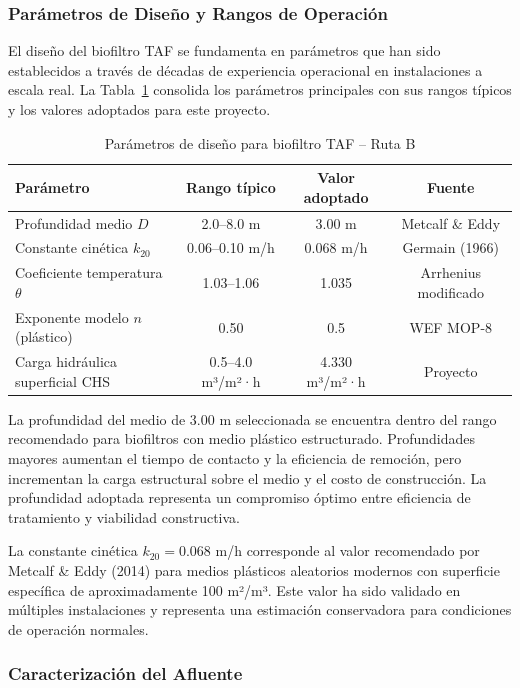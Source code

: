 \documentclass[12pt,a4paper]{article}
\begin{document}
\subsubsection*{Parámetros de Diseño y Rangos de Operación}

El diseño del biofiltro TAF se fundamenta en parámetros que han sido establecidos a través de décadas de experiencia operacional en instalaciones a escala real. La Tabla~\ref{tab:parametros_taf} consolida los parámetros principales con sus rangos típicos y los valores adoptados para este proyecto.

\begin{table}[H]
\centering
\caption{Parámetros de diseño para biofiltro TAF -- Ruta B}
\label{tab:parametros_taf}
\begin{tabular}{p{4cm}ccc}
\toprule
\textbf{Parámetro} & \textbf{Rango típico} & \textbf{Valor adoptado} & \textbf{Fuente} \\
\midrule
Profundidad medio $D$ & 2.0--8.0 m & 3.00 m & Metcalf \& Eddy \\
Constante cinética $k_{20}$ & 0.06--0.10 m/h & 0.068 m/h & Germain (1966) \\
Coeficiente temperatura $\theta$ & 1.03--1.06 & 1.035 & Arrhenius modificado \\
Exponente modelo $n$ (plástico) & 0.50 & 0.5 & WEF MOP-8 \\
Carga hidráulica superficial CHS & 0.5--4.0 m³/m²·h & 4.330 m³/m²·h & Proyecto \\
\bottomrule
\end{tabular}
\end{table}

La profundidad del medio de 3.00 m seleccionada se encuentra dentro del rango recomendado para biofiltros con medio plástico estructurado. Profundidades mayores aumentan el tiempo de contacto y la eficiencia de remoción, pero incrementan la carga estructural sobre el medio y el costo de construcción. La profundidad adoptada representa un compromiso óptimo entre eficiencia de tratamiento y viabilidad constructiva.

La constante cinética $k_{20} = 0.068$ m/h corresponde al valor recomendado por Metcalf \& Eddy (2014) para medios plásticos aleatorios modernos con superficie específica de aproximadamente 100 m²/m³. Este valor ha sido validado en múltiples instalaciones y representa una estimación conservadora para condiciones de operación normales.

\subsubsection*{Caracterización del Afluente}
\end{document}

